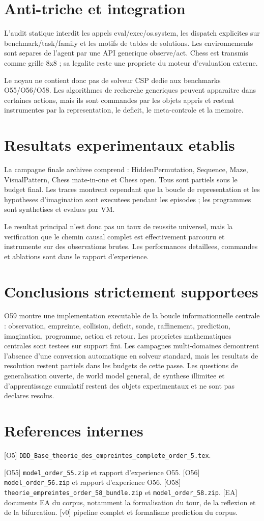 \documentclass[11pt,a4paper]{article}
\begin{document}
\section{Anti-triche et integration}
L'audit statique interdit les appels eval/exec/os.system, les dispatch explicites sur benchmark/task/family et les motifs de tables de solutions. Les environnements sont separes de l'agent par une API generique observe/act. Chess est transmis comme grille 8x8 ; sa legalite reste une propriete du moteur d'evaluation externe.

Le noyau ne contient donc pas de solveur CSP dedie aux benchmarks O55/O56/O58. Les algorithmes de recherche generiques peuvent apparaitre dans certaines actions, mais ils sont commandes par les objets appris et restent instrumentes par la representation, le deficit, le meta-controle et la memoire.

\section{Resultats experimentaux etablis}
La campagne finale archivee comprend : HiddenPermutation, Sequence, Maze, VisualPattern, Chess mate-in-one et Chess open. Tous sont partiels sous le budget final. Les traces montrent cependant que la boucle de representation et les hypotheses d'imagination sont executees pendant les episodes ; les programmes sont synthetises et evalues par VM.

Le resultat principal n'est donc pas un taux de reussite universel, mais la verification que le chemin causal complet est effectivement parcouru et instrumente sur des observations brutes. Les performances detaillees, commandes et ablations sont dans le rapport d'experience.

\section{Conclusions strictement supportees}
O59 montre une implementation executable de la boucle informationnelle centrale : observation, empreinte, collision, deficit, sonde, raffinement, prediction, imagination, programme, action et retour. Les proprietes mathematiques centrales sont testees sur support fini. Les campagnes multi-domaines demontrent l'absence d'une conversion automatique en solveur standard, mais les resultats de resolution restent partiels dans les budgets de cette passe. Les questions de generalisation ouverte, de world model general, de synthese illimitee et d'apprentissage cumulatif restent des objets experimentaux et ne sont pas declares resolus.

\section{References internes}
[O5] \texttt{DDD\_Base\_theorie\_des\_empreintes\_complete\_order\_5.tex}.

[O55] \texttt{model\_order\_55.zip} et rapport d'experience O55.
[O56] \texttt{model\_order\_56.zip} et rapport d'experience O56.
[O58] \texttt{theorie\_empreintes\_order\_58\_bundle.zip} et \texttt{model\_order\_58.zip}.
[EA] documents EA du corpus, notamment la formalisation du tour, de la reflexion et de la bifurcation.
[v0] pipeline complet et formalisme prediction du corpus.
\end{document}
